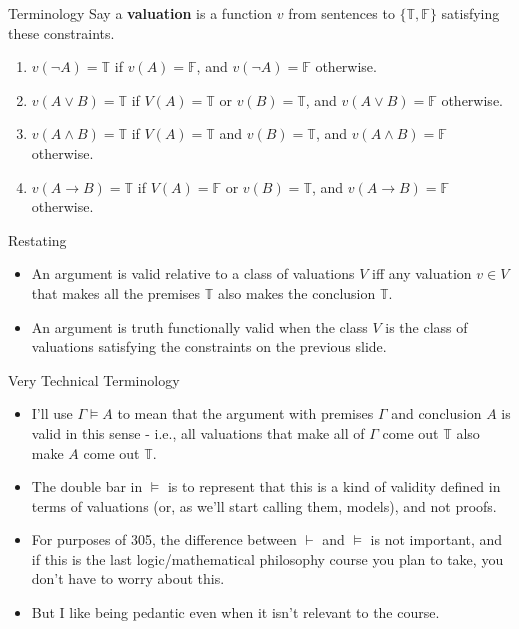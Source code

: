 \documentclass[
  ignorenonframetext,
]{beamer}
\providecommand{\tightlist}{%
  \setlength{\itemsep}{0pt}\setlength{\parskip}{0pt}}
\renewcommand{\,}{\text{, }}
\def\True{\mathbb{T}}
\def\False{\mathbb{F}}
\begin{document}
\begin{frame}{Terminology}
\protect\hypertarget{terminology}{}
Say a \textbf{valuation} is a function \(v\) from sentences to
\(\{\True, \False\}\) satisfying these constraints.

\begin{enumerate}
\tightlist
\item
  \(v(\neg A) = \True\) if \(v(A) = \False\), and \(v(\neg A) = \False\)
  otherwise.
\item
  \(v(A \vee B) = \True\) if \(V(A) = \True\) or \(v(B) = \True\), and
  \(v(A \vee B) = \False\) otherwise.
\item
  \(v(A \wedge B) = \True\) if \(V(A) = \True\) and \(v(B) = \True\),
  and \(v(A \wedge B) = \False\) otherwise.
\item
  \(v(A \rightarrow B) = \True\) if \(V(A) = \False\) or
  \(v(B) = \True\), and \(v(A \rightarrow B) = \False\) otherwise.
\end{enumerate}
\end{frame}

\begin{frame}{Restating}
\protect\hypertarget{restating}{}
\begin{itemize}[<+->]
\tightlist
\item
  An argument is valid relative to a class of valuations \(V\) iff any
  valuation \(v \in V\) that makes all the premises \(\True\) also makes
  the conclusion \(\True\).
\item
  An argument is truth functionally valid when the class \(V\) is the
  class of valuations satisfying the constraints on the previous slide.
\end{itemize}
\end{frame}

\begin{frame}{Very Technical Terminology}
\protect\hypertarget{very-technical-terminology}{}
\begin{itemize}
\tightlist
\item
  I'll use \(\Gamma \vDash A\) to mean that the argument with premises
  \(\Gamma\) and conclusion \(A\) is valid in this sense - i.e., all
  valuations that make all of \(\Gamma\) come out \(\True\) also make
  \(A\) come out \(\True\).
\item
  The double bar in \(\vDash\) is to represent that this is a kind of
  validity defined in terms of valuations (or, as we'll start calling
  them, models), and not proofs.
\item
  For purposes of 305, the difference between \(\vdash\) and \(\vDash\)
  is not important, and if this is the last logic/mathematical
  philosophy course you plan to take, you don't have to worry about
  this.
\item
  But I like being pedantic even when it isn't relevant to the course.
\end{itemize}
\end{frame}
\end{document}

